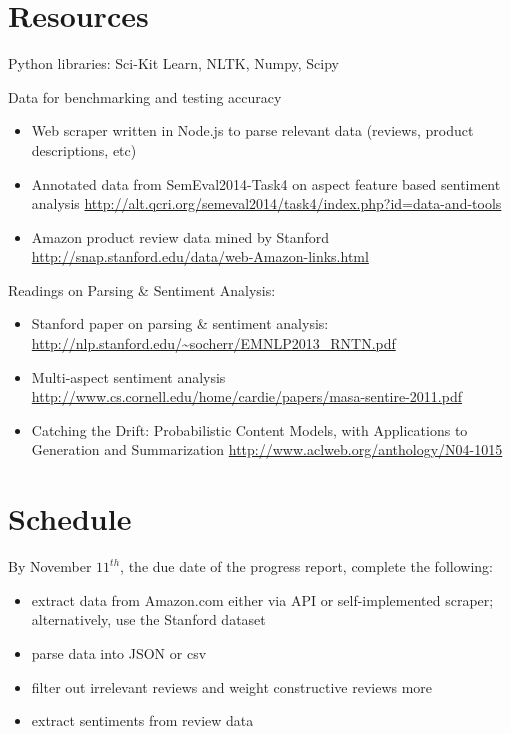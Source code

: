 \documentclass{article}
\begin{document}
\section{Resources}

Python libraries: Sci-Kit Learn, NLTK, Numpy, Scipy

Data for benchmarking and testing accuracy

\begin{itemize}
\item Web scraper written in Node.js to parse relevant data (reviews, product descriptions, etc)
\newline 

\item Annotated data from SemEval2014-Task4 on aspect feature based sentiment analysis
\newline
\url{http://alt.qcri.org/semeval2014/task4/index.php?id=data-and-tools}

\item Amazon product review data mined by Stanford
\newline
\url{http://snap.stanford.edu/data/web-Amazon-links.html}
\end{itemize}

Readings on Parsing \& Sentiment Analysis:
\begin{itemize}
\item Stanford paper on parsing \& sentiment analysis:
\newline
\url{http://nlp.stanford.edu/~socherr/EMNLP2013_RNTN.pdf}

\item Multi-aspect sentiment analysis
\newline 
\url{http://www.cs.cornell.edu/home/cardie/papers/masa-sentire-2011.pdf}

\item Catching the Drift: Probabilistic Content Models, with Applications to
Generation and Summarization \newline
\url{http://www.aclweb.org/anthology/N04-1015}
\end{itemize}

\section{Schedule}

By November $11^{th}$, the due date of the progress report, complete the following:

\begin{itemize}
\item extract data from Amazon.com either via API or self-implemented scraper; alternatively, use the Stanford dataset

\item parse data into JSON or csv

\item filter out irrelevant reviews and weight constructive reviews more

\item extract sentiments from review data

\end{itemize}
\end{document}
